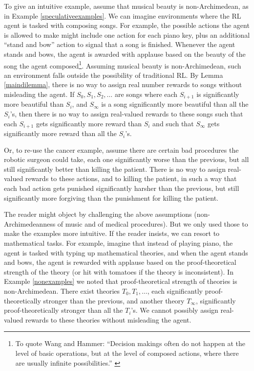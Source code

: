 \documentclass[reqno]{article}
\theoremstyle{definition}
\begin{document}
To give an intuitive example, assume that musical beauty is non-Archimedean,
as in Example \ref{speculativeexamples}. We can imagine environments where the
RL agent is tasked with composing songs. For example, the possible actions the
agent is allowed to make might include one action for each piano key, plus
an additional ``stand and bow'' action to signal that a song is
finished.
Whenever the agent stands and bows, the agent is awarded with applause based on
the beauty of the song the agent
composed\footnote{To quote Wang and Hammer: ``Decision makings often do not happen
at the level of basic operations, but at the level of composed actions, where
there are usually infinite possibilities.'' \cite{wang2015assumptions}}. Assuming
musical beauty is
non-Archimedean, such an environment falls outside the possibility of traditional
RL. By Lemma \ref{maindilemma}, there is no way to assign real number
rewards to songs without misleading the agent. If $S_0,S_1,S_2,\ldots$ are songs
where each $S_{i+1}$ is significantly more beautiful than $S_i$, and $S_\infty$
is a song significantly more beautiful than all the $S_i$'s, then there is no way to
assign real-valued rewards to these songs such that each $S_{i+1}$ gets
significantly more reward than $S_i$ and such that $S_\infty$ gets significantly
more reward than all the $S_i$'s.

Or, to re-use the cancer example, assume there are certain bad procedures the
robotic surgeon could take, each one significantly worse than the previous,
but all still significantly better than killing the patient. There is no way
to assign real-valued rewards to these actions, and to killing the patient,
in such a way that each bad action gets punished significantly harsher than
the previous, but still significantly more forgiving than the punishment for
killing the patient.

The reader might object by challenging the above assumptions (non-Archimedeanness
of music and of medical procedures). But we only used those to make the examples
more intuitive. If the reader insists, we can resort to mathematical tasks.
For example, imagine that instead of playing piano, the agent is tasked with
typing up mathematical theories, and when the agent stands and bows, the agent
is rewarded with applause based on the proof-theoretical strength of the theory
(or hit with tomatoes if the theory is inconsistent).
In Example \ref{nonexamples} we noted that proof-theoretical strength of theories
is non-Archimedean. There exist theories $T_0,T_1,\ldots$, each significantly
proof-theoretically stronger than the previous, and another theory $T_\infty$,
significantly proof-theoretically stronger than all the $T_i$'s. We cannot
possibly assign real-valued rewards to these theories without misleading the
agent.
\end{document}
